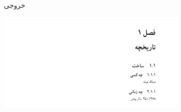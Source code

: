 \begin{frame}{خروجی}
\begin{center}
\includegraphics[width=0.7\textwidth, height=0.6\textheight]{docs/images/chsec-fa}
\end{center}
\end{frame}